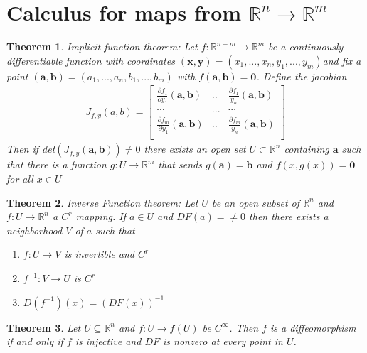 \documentclass[11pt]{book}
\newtheorem{theorem}{Theorem}[section]
\begin{document}
	
	\section{Calculus for maps from $\mathbb{R}^n \rightarrow \mathbb{R}^m$}
	
	\begin{theorem}
		Implicit function theorem: Let $f: \mathbb{R}^{n+m} \rightarrow \mathbb{R}^m$  be a continuously differentiable function with coordinates $(\mathbf{x},\mathbf{y}) = (x_1,...,x_n,y_1,...,y_m)$and fix a point
		$(\mathbf{a},\mathbf{b}) = (a_1,...,a_n,b_1,...,b_m)$ with $f(\mathbf{a},\mathbf{b}) = \mathbf{0}$.
		Define the jacobian 
		\begin{align*}
			J_{f,y}(a,b) = \begin{bmatrix}
				\frac{\partial f_1}{\partial y_1}(\mathbf{a},\mathbf{b})  & .. & \frac{\partial f_1}{y_n}(\mathbf{a},\mathbf{b})\\
				\cdots & ... & \cdots\\
				\frac{\partial f_m}{\partial y_1}(\mathbf{a},\mathbf{b})  & .. & \frac{\partial f_m}{y_n}(\mathbf{a},\mathbf{b})\\
			\end{bmatrix}
		\end{align*}
		Then if det$(J_{f,y}(\mathbf{a},\mathbf{b})) \neq 0$ there exists an open set $U \subset \mathbb{R}^n$ containing $\mathbf{a}$ such that there is a function $g: U \rightarrow \mathbb{R}^m$ that sends $g(\mathbf{a}) = \mathbf{b}$ and $f(x,g(x)) = \mathbf{0}$ for all $x \in U$
	\end{theorem}
	
	\begin{theorem}
		Inverse Function theorem: Let $U$ be an open subset of $\mathbb{R}^n$ and $f: U \rightarrow \mathbb{R}^n$ a $C^r$ mapping. If $a \in U$ and $DF(a) = \neq 0$ then there exists a neighborhood $V$ of $a$ such that 
		\begin{enumerate}
			\item $f: U \rightarrow V$ is invertible and $C^r$
			\item $f^{-1}: V \rightarrow U$ is $C^r$
			\item $D(f^{-1})(x) = (DF(x))^{-1}$
		\end{enumerate}
	\end{theorem}
	\begin{theorem}
		Let $U \subseteq \mathbb{R}^n$ and $f: U \rightarrow f(U)$ be $C^\infty$. Then $f$ is a diffeomorphism if and only if $f$ is injective and $DF$ is nonzero at every point in $U$.
	\end{theorem}
	
\end{document}

